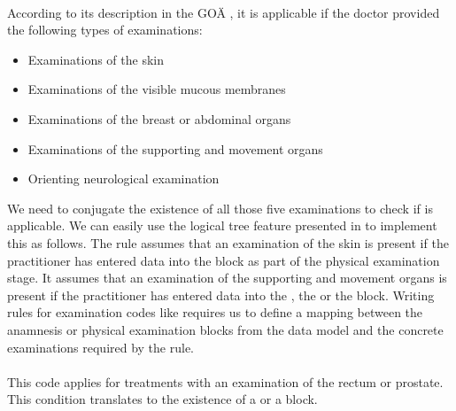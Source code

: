 \paragraph{}
According to its description in the GOÄ \cite{hermanns2015ebm}, it is applicable if the doctor provided the following types of examinations:
\begin{itemize}
    \item Examinations of the skin
    \item Examinations of the visible mucous membranes
    \item Examinations of the breast or abdominal organs
    \item Examinations of the supporting and movement organs
    \item Orienting neurological examination
\end{itemize}
We need to conjugate the existence of all those five examinations to check if  is applicable.
We can easily use the logical tree feature presented in \addref to implement this as follows.
The rule assumes that an examination of the skin is present if the practitioner has entered data into the  block as part of the physical examination stage.
It assumes that an examination of the supporting and movement organs is present if the practitioner has entered data into the , the  or the  block.
Writing rules for examination codes like  requires us to define a mapping between the anamnesis or physical examination blocks from the \AV data model and the concrete examinations required by the rule.



\paragraph{}
This code applies for treatments with an examination of the rectum or prostate.
This condition translates to the existence of a  or a  block.






